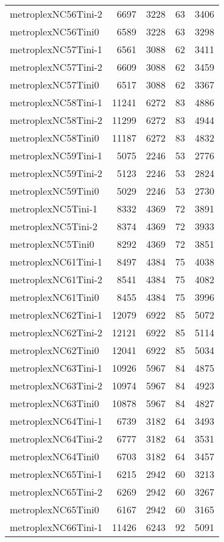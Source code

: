 \begin{longtable}{lrrrr}
metroplexNC56Tini-2 & 6697 & 3228 & 63 & 3406 \\
metroplexNC56Tini0 & 6589 & 3228 & 63 & 3298 \\
metroplexNC57Tini-1 & 6561 & 3088 & 62 & 3411 \\
metroplexNC57Tini-2 & 6609 & 3088 & 62 & 3459 \\
metroplexNC57Tini0 & 6517 & 3088 & 62 & 3367 \\
metroplexNC58Tini-1 & 11241 & 6272 & 83 & 4886 \\
metroplexNC58Tini-2 & 11299 & 6272 & 83 & 4944 \\
metroplexNC58Tini0 & 11187 & 6272 & 83 & 4832 \\
metroplexNC59Tini-1 & 5075 & 2246 & 53 & 2776 \\
metroplexNC59Tini-2 & 5123 & 2246 & 53 & 2824 \\
metroplexNC59Tini0 & 5029 & 2246 & 53 & 2730 \\
metroplexNC5Tini-1 & 8332 & 4369 & 72 & 3891 \\
metroplexNC5Tini-2 & 8374 & 4369 & 72 & 3933 \\
metroplexNC5Tini0 & 8292 & 4369 & 72 & 3851 \\
metroplexNC61Tini-1 & 8497 & 4384 & 75 & 4038 \\
metroplexNC61Tini-2 & 8541 & 4384 & 75 & 4082 \\
metroplexNC61Tini0 & 8455 & 4384 & 75 & 3996 \\
metroplexNC62Tini-1 & 12079 & 6922 & 85 & 5072 \\
metroplexNC62Tini-2 & 12121 & 6922 & 85 & 5114 \\
metroplexNC62Tini0 & 12041 & 6922 & 85 & 5034 \\
metroplexNC63Tini-1 & 10926 & 5967 & 84 & 4875 \\
metroplexNC63Tini-2 & 10974 & 5967 & 84 & 4923 \\
metroplexNC63Tini0 & 10878 & 5967 & 84 & 4827 \\
metroplexNC64Tini-1 & 6739 & 3182 & 64 & 3493 \\
metroplexNC64Tini-2 & 6777 & 3182 & 64 & 3531 \\
metroplexNC64Tini0 & 6703 & 3182 & 64 & 3457 \\
metroplexNC65Tini-1 & 6215 & 2942 & 60 & 3213 \\
metroplexNC65Tini-2 & 6269 & 2942 & 60 & 3267 \\
metroplexNC65Tini0 & 6167 & 2942 & 60 & 3165 \\
metroplexNC66Tini-1 & 11426 & 6243 & 92 & 5091 \\

\end{longtable}
